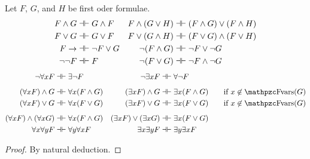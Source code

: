\begin{lemma}\cite{Huth:2004:LCS:975331}
	Let \( F \), \( G \), and \( H \) be first oder formulae.
	\begin{align*}
		F \land G &\dashv\vdash G \land F 
		&
		F \land ( G \lor H) &\dashv\vdash (F\land G) \lor (F\land H)
		\\
		F \lor G &\dashv\vdash G \lor F
		&
		F \lor ( G \land H) &\dashv\vdash (F \lor G) \land (F \lor H)
		\\
		F \rightarrow &\dashv\vdash \lnot F \lor G
		&
		\lnot( F \land G) &\dashv\vdash \lnot F \lor \lnot G
		\\
		\lnot \lnot F &\dashv\vdash F
		&
		\lnot( F \lor G) &\dashv\vdash \lnot F \land \lnot G
	\end{align*}
% 
	\begin{align*}
		\lnot \forall x F &\biprove \exists \lnot F & 
		\lnot \exists x F &\biprove \forall \lnot F 
		\\[0.5em]
		(\forall x F) \land G &\biprove \forall x ( F \land G) &
		(\exists x F) \land G &\biprove \exists x ( F \land G ) 
		\tag*{if \( x\not\in\fvar(G)\)} 
		\\
		(\forall x F) \lor G &\biprove \forall x ( F \lor G) &
		(\exists x F) \lor G &\biprove \exists x ( F \lor G )
		\tag*{if \( x\not\in\fvar(G)\)} 
		\\[0.5em]
		(\forall x F) \land (\forall x G) &\biprove \forall x (F \land G) &
		(\exists x F) \lor (\exists x G) &\biprove \exists x (F \lor G)
		\\
		\forall x \forall y F &\biprove \forall y \forall x F &
		\exists x \exists y F &\biprove \exists y \exists x F
	\end{align*}
\end{lemma}
\begin{proof}
	By natural deduction.
\end{proof}